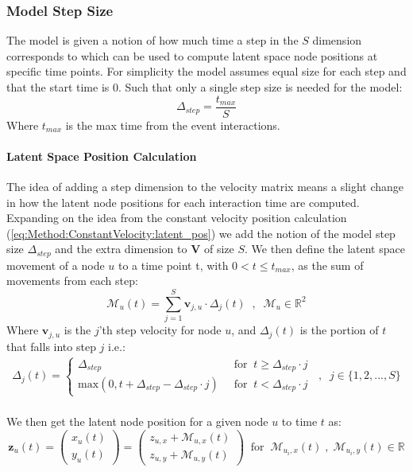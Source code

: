 \subsubsection{Model Step Size}
The model is given a notion of how much time a step in the $S$ dimension corresponds to which can be used to compute latent space node positions at specific time points. For simplicity the model assumes equal size for each step and that the start time is 0. Such that only a single step size is needed for the model:
\begin{equation}
    \Delta_{step} = \frac{t_{max}}{S}
\end{equation}
Where $t_{max}$ is the max time from the event interactions.

\paragraph{Latent Space Position Calculation}
\label{sec:Method:StepwiseLatentSpacePositions}
The idea of adding a step dimension to the velocity matrix means a slight change in how the latent node positions for each interaction time are computed. Expanding on the idea from the constant velocity position calculation (\ref{eq:Method:ConstantVelocity:latent_pos}) we add the notion of the model step size $\Delta_{step}$ and the extra dimension to $\textbf{V}$ of size $S$. 
We then define the latent space movement of a node $u$ to a time point t, with $0 < t \le t_{max}$, as the sum of movements from each step:
\begin{equation}
    \mathcal{M}_{u}(t) = \sum_{j = 1}^{S} \textbf{v}_{j, u} \cdot \Delta_{j}(t) \;\;,\;\; \mathcal{M}_{u} \in \mathbb{R}^2
\end{equation}
Where $\textbf{v}_{j,u}$ is the $j$'th step velocity for node $u$, and $\Delta_{j}(t)$ is the portion of $t$ that falls into step $j$ i.e.:
\begin{align}
    \Delta_{j}(t) = 
    \begin{cases}
        \Delta_{step} \;\; &\text{for} \;\; t \ge \Delta_{step} \cdot j\\
        \text{max}\left(0, t + \Delta_{step} - \Delta_{step} \cdot j\right) \;\; &\text{for} \;\; t < \Delta_{step} \cdot j
   \end{cases} \;\; , \;\; j \in \{1,2,...,S\}
\end{align}
\\
We then get the latent node position for a given node $u$ to time $t$ as:
\begin{equation}
    \textbf{z}_{u}(t) = 
    \begin{pmatrix}
        x_{u}(t) \\
        y_{u}(t)
    \end{pmatrix}
    =
    \begin{pmatrix}
        z_{u,x} + \mathcal{M}_{u,x}(t) \\
        z_{u,y}+ \mathcal{M}_{u,y}(t)
    \end{pmatrix}
    \;\; \text{for} \;\; \mathcal{M}_{u_i,x}(t) \;,\; \mathcal{M}_{u_i,y}(t) \in \mathbb{R}
    \label{eq:Method:ConstantVelocity:latent_pos}
\end{equation}
